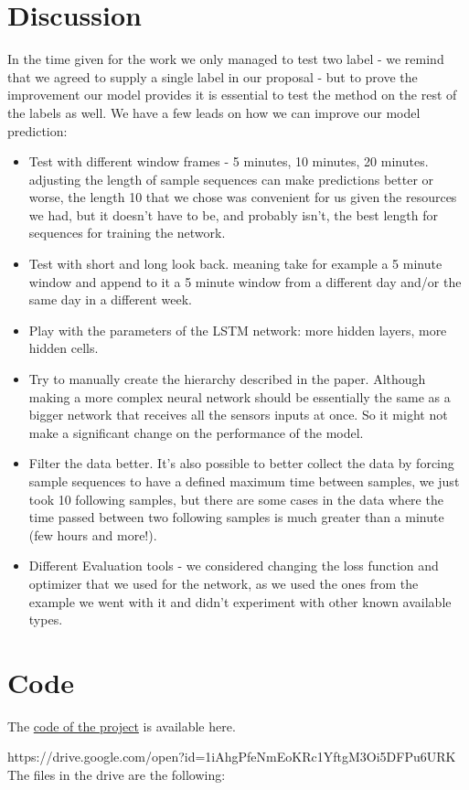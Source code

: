 \documentclass{article}
\begin{document}
\section{Discussion}
In the time given for the work we only managed to test two label - we remind that we agreed to supply a single label in our proposal - but to prove the improvement our model provides it is essential to test the method on the rest of the labels as well. 
We have a few leads on how we can improve our model prediction:
\begin{itemize}
  \item Test with different window frames - 5 minutes, 10 minutes, 20 minutes. adjusting the length of sample sequences can make predictions better or worse, the length 10 that we chose was convenient for us given the resources we had, but it doesn't have to be, and probably isn't, the best length for sequences for training the network.
  \item Test with short and long look back. meaning take for example a 5 minute window and append to it a 5 minute window from a different day and/or the same day in a different week.  
  \item Play with the parameters of the LSTM network: more hidden layers, more hidden cells.
  \item Try to manually create the hierarchy described in the paper. 
  Although making a more complex neural network should be essentially the same as a bigger network that receives all the sensors inputs at once. So it might not make a significant change on the performance of the model.
  \item Filter the data better. It's also possible to better collect the data by forcing sample sequences to have a defined maximum time between samples, we just took 10 following samples, but there are some cases in the data where the time passed between two following samples is much greater than a minute (few hours and more!).
  \item Different Evaluation tools - we considered changing the loss function and optimizer that we used for the network, as we used the ones from the example we went with it and didn't experiment with other known available types.
\end{itemize}


\section{Code}
The \href{https://drive.google.com/open?id=1iAhgPfeNmEoKRc1YftgM3Oi5DFPu6URK}{code of the project} is available here.\par
https://drive.google.com/open?id=1iAhgPfeNmEoKRc1YftgM3Oi5DFPu6URK
The files in the drive are the following:
\end{document}
